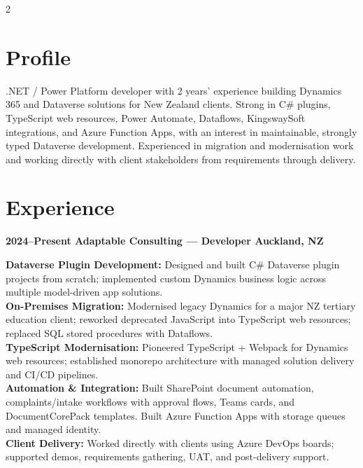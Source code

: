 \documentclass[lighthipster]{simplehipstercv}
\begin{document}
\begin{paracol}{2}
{\phantom{turn the page}
}

\switchcolumn

\small
\raggedright

\section*{Profile}

.NET / Power Platform developer with 2 years' experience building Dynamics 365 and Dataverse solutions for New Zealand clients. Strong in C\# plugins, TypeScript web resources, Power Automate, Dataflows, KingswaySoft integrations, and Azure Function Apps, with an interest in maintainable, strongly typed Dataverse development. Experienced in migration and modernisation work and working directly with client stakeholders from requirements through delivery.

\bigskip

\section*{Experience}

\noindent\textbf{2024--Present \hfill Adaptable Consulting --- Developer \hfill Auckland, NZ}

\vspace{0.3em}
\noindent\textbf{Dataverse Plugin Development:} Designed and built C\# Dataverse plugin projects from scratch; implemented custom Dynamics business logic across multiple model-driven app solutions.\\[0.3em]
\textbf{On-Premises Migration:} Modernised legacy Dynamics for a major NZ tertiary education client; reworked deprecated JavaScript into TypeScript web resources; replaced SQL stored procedures with Dataflows.\\[0.3em]
\textbf{TypeScript Modernisation:} Pioneered TypeScript + Webpack for Dynamics web resources; established monorepo architecture with managed solution delivery and CI/CD pipelines.\\[0.3em]
\textbf{Automation \& Integration:} Built SharePoint document automation, complaints/intake workflows with approval flows, Teams cards, and DocumentCorePack templates. Built Azure Function Apps with storage queues and managed identity.\\[0.3em]
\textbf{Client Delivery:} Worked directly with clients using Azure DevOps boards; supported demos, requirements gathering, UAT, and post-delivery support.


\end{paracol}
\end{document}
